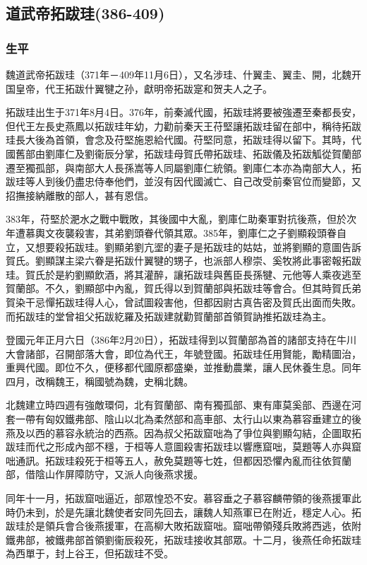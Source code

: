 
\subsection{道武帝拓跋珪\tiny(386-409)}

\subsubsection{生平}

魏道武帝拓跋珪（371年－409年11月6日），又名涉珪、什翼圭、翼圭、開，北魏开国皇帝，代王拓跋什翼犍之孙，獻明帝拓跋寔和贺夫人之子。

拓跋珪出生于371年8月4日。376年，前秦滅代國，拓跋珪將要被強遷至秦都長安，但代王左長史燕鳳以拓跋珪年幼，力勸前秦天王苻堅讓拓跋珪留在部中，稱待拓跋珪長大後為首領，會念及苻堅施恩給代國。苻堅同意，拓跋珪得以留下。其時，代國舊部由劉庫仁及劉衞辰分掌，拓跋珪母賀氏帶拓跋珪、拓跋儀及拓跋觚從賀蘭部遷至獨孤部，與南部大人長孫嵩等人同屬劉庫仁統領。劉庫仁本亦為南部大人，拓跋珪等人到後仍盡忠侍奉他們，並沒有因代國滅亡、自己改受前秦官位而變節，又招撫接納離散的部人，甚有恩信。

383年，苻堅於淝水之戰中戰敗，其後國中大亂，劉庫仁助秦軍對抗後燕，但於次年遭慕輿文夜襲殺害，其弟劉頭眷代領其眾。385年，劉庫仁之子劉顯殺頭眷自立，又想要殺拓跋珪。劉顯弟劉亢埿的妻子是拓跋珪的姑姑，並將劉顯的意圖告訴賀氏。劉顯謀主梁六眷是拓跋什翼犍的甥子，也派部人穆崇、奚牧將此事密報拓跋珪。賀氏於是約劉顯飲酒，將其灌醉，讓拓跋珪與舊臣長孫犍、元他等人乘夜逃至賀蘭部。不久，劉顯部中內亂，賀氏得以到賀蘭部與拓跋珪等會合。但其時賀氏弟賀染干忌憚拓跋珪得人心，曾試圖殺害他，但都因尉古真告密及賀氏出面而失敗。而拓跋珪的堂曾祖父拓跋紇羅及拓跋建就勸賀蘭部首領賀訥推拓跋珪為主。

登國元年正月六日（386年2月20日），拓跋珪得到以賀蘭部為首的諸部支持在牛川大會諸部，召開部落大會，即位為代王，年號登國。拓跋珪任用賢能，勵精圖治，重興代國。即位不久，便移都代國原都盛樂，並推動農業，讓人民休養生息。同年四月，改稱魏王，稱國號為魏，史稱北魏。

北魏建立時四週有強敵環伺，北有賀蘭部、南有獨孤部、東有庫莫奚部、西邊在河套一帶有匈奴鐵弗部、陰山以北為柔然部和高車部、太行山以東為慕容垂建立的後燕及以西的慕容永統治的西燕。因為叔父拓跋窟咄為了爭位與劉顯勾結，企圖取拓跋珪而代之形成內部不穩，于桓等人意圖殺害拓跋珪以響應窟咄，莫題等人亦與窟咄通訊。拓跋珪殺死于桓等五人，赦免莫題等七姓，但都因恐懼內亂而往依賀蘭部，借陰山作屏障防守，又派人向後燕求援。

同年十一月，拓跋窟咄逼近，部眾惶恐不安。慕容垂之子慕容麟帶領的後燕援軍此時仍未到，於是先讓北魏使者安同先回去，讓魏人知燕軍已在附近，穩定人心。拓跋珪於是領兵會合後燕援軍，在高柳大敗拓跋窟咄。窟咄帶領殘兵敗將西逃，依附鐵弗部，被鐵弗部首領劉衞辰殺死，拓跋珪接收其部眾。十二月，後燕任命拓跋珪為西單于，封上谷王，但拓跋珪不受。

